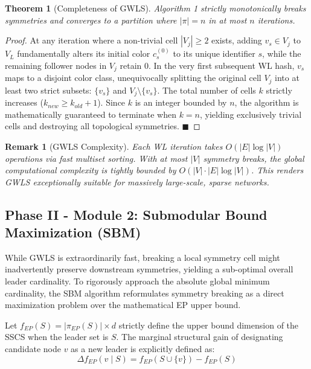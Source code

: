 \documentclass{IEEEtran}
\newtheorem{theorem}{Theorem}
\newtheorem{remark}{Remark}
\begin{document}
	\begin{theorem}[Completeness of GWLS]
		Algorithm 1 strictly monotonically breaks symmetries and converges to a partition where $|\pi| = n$ in at most $n$ iterations.
	\end{theorem}
	\begin{proof}
		At any iteration where a non-trivial cell $|V_j| \ge 2$ exists, adding $v_s \in V_j$ to $V_L$ fundamentally alters its initial color $c_s^{(0)}$ to its unique identifier $s$, while the remaining follower nodes in $V_j$ retain $0$. In the very first subsequent WL hash, $v_s$ maps to a disjoint color class, unequivocally splitting the original cell $V_j$ into at least two strict subsets: $\{v_s\}$ and $V_j \setminus \{v_s\}$. The total number of cells $k$ strictly increases ($k_{new} \ge k_{old} + 1$). Since $k$ is an integer bounded by $n$, the algorithm is mathematically guaranteed to terminate when $k=n$, yielding exclusively trivial cells and destroying all topological symmetries. \hfill $\blacksquare$
	\end{proof}
	
	\begin{remark}[GWLS Complexity]
		Each WL iteration takes $O(|E| \log |V|)$ operations via fast multiset sorting. With at most $|V|$ symmetry breaks, the global computational complexity is tightly bounded by $O(|V| \cdot |E| \log |V|)$. This renders GWLS exceptionally suitable for massively large-scale, sparse networks.
	\end{remark}
	
	\subsection{Phase II - Module 2: Submodular Bound Maximization (SBM)}
	While GWLS is extraordinarily fast, breaking a local symmetry cell might inadvertently preserve downstream symmetries, yielding a sub-optimal overall leader cardinality. To rigorously approach the absolute global minimum cardinality, the SBM algorithm reformulates symmetry breaking as a direct maximization problem over the mathematical EP upper bound.
	
	Let $f_{EP}(S) = |\pi_{EP}(S)| \times d$ strictly define the upper bound dimension of the SSCS when the leader set is $S$. The marginal structural gain of designating candidate node $v$ as a new leader is explicitly defined as:
	\begin{equation}
		\Delta f_{EP}(v \mid S) = f_{EP}(S \cup \{v\}) - f_{EP}(S) \label{eq:marginal_gain}
	\end{equation}
	
\end{document}

